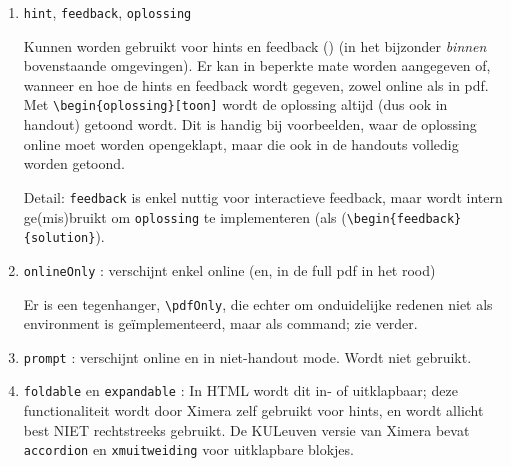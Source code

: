 \documentclass{ximera}
\begin{document}
\begin{enumerate}
    De omgeving \verb|question| is aangepast zodat ze minimale header heeft (enkel een nummer), en dus in de praktijk binnen een oefening of voorbeeld kan gebruikt worden als alternatief voor \verb|itemize| of \verb|enumerate|.

    Binnen deze environments kunnen antwoorden worden gevraagd, en hints, feedback of oplossingen gegeven.
    \begin{itemize}
        \item \verb|answer|
        \item \verb|choice|
    \end{itemize}

    Zie verder voor meer uitleg, voorbeelden en afspraken voor het concrete gebruik van deze omgevingen in de zomercursus.


        
    \item \verb|hint|, \verb|feedback|, \verb|oplossing| 
    
    Kunnen worden gebruikt voor hints en feedback (\Smiley) (in het bijzonder \textit{binnen} bovenstaande omgevingen). 
    Er kan in beperkte mate worden aangegeven of, wanneer en hoe de hints en feedback wordt gegeven, zowel online als in pdf. 
    Met \verb|\begin{oplossing}[toon]| wordt de oplossing altijd (dus ook in handout) getoond wordt. Dit is handig bij voorbeelden, waar de oplossing  online moet worden opengeklapt, maar die ook in de handouts volledig worden getoond.
    
    Detail: \verb|feedback| is enkel nuttig voor interactieve feedback, maar wordt intern ge(mis)bruikt om \verb|oplossing| te implementeren (als  (\verb|\begin{feedback}{solution}|).
    
       
    \item \verb|onlineOnly| : verschijnt enkel online (en, in de full pdf in het rood)
      
    Er is een tegenhanger, \verb|\pdfOnly|, die echter om onduidelijke redenen niet als environment is geïmplementeerd, maar als command; zie verder.
      
    \item \verb|prompt| :  verschijnt online en in niet-handout mode. Wordt niet gebruikt. 

    \item \verb|foldable| en \verb|expandable| : In HTML wordt dit in- of uitklapbaar; deze functionaliteit wordt door Ximera zelf gebruikt voor hints, en wordt allicht best NIET rechtstreeks gebruikt. De KULeuven versie van Ximera bevat \verb|accordion| en \verb|xmuitweiding| voor uitklapbare blokjes.

\end{enumerate}
    
\end{document}
